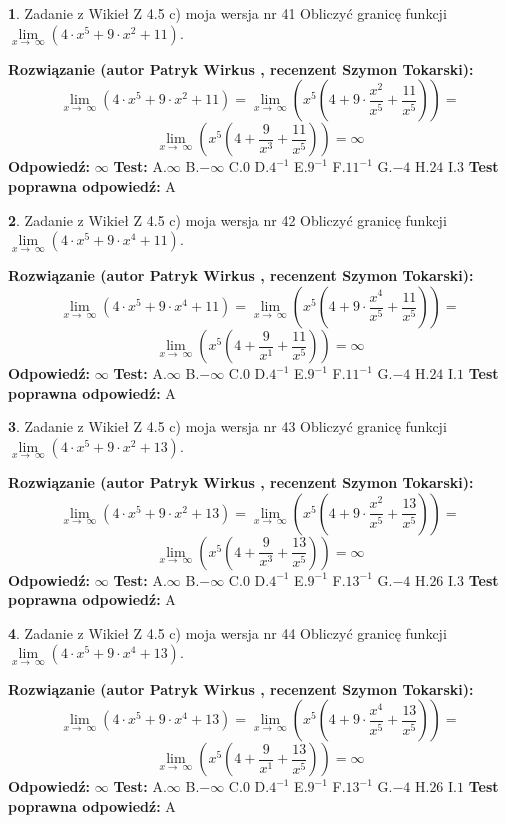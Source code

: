 \documentclass[12pt, a4paper]{article}
\theoremstyle{definition} %
\newtheorem{zad}{}
\newcommand{\zadStart}[1]{\begin{zad}#1\newline}
\newcommand{\zadStop}{\end{zad}}
\newcommand{\rozwStart}[2]{\noindent \textbf{Rozwiązanie (autor #1 , recenzent #2): }\newline}
\newcommand{\rozwStop}{\newline}
\newcommand{\odpStart}{\noindent \textbf{Odpowiedź:}\newline}
\newcommand{\odpStop}{\newline}
\newcommand{\testStart}{\noindent \textbf{Test:}\newline}
\newcommand{\testStop}{\newline}
\newcommand{\kluczStart}{\noindent \textbf{Test poprawna odpowiedź:}\newline}
\newcommand{\kluczStop}{\newline}
\begin{document}
\zadStart{Zadanie z Wikieł Z 4.5 c) moja wersja nr 41}
Obliczyć granicę funkcji  $\lim\limits_{x\to\ \infty}(4 \cdot x^{5}+9 \cdot x^{2}+11)$.
\zadStop
\rozwStart{Patryk Wirkus}{Szymon Tokarski}
$$\lim\limits_{x\to\ \infty}(4 \cdot x^{5}+9 \cdot x^{2}+11) = \lim\limits_{x\to\ \infty}(x^{5}(4 +9 \cdot \frac{x^{2}}{x^{5}}+\frac{11}{x^{5}})) =$$ $$\lim\limits_{x\to\ \infty}(x^{5}(4 +\frac{9}{x^{3}}+\frac{11}{x^{5}})) =\infty$$
\rozwStop
\odpStart
$\infty$
\odpStop
\testStart
A.$\infty$ B.$-\infty$ C.$0$ D.$4^{-1}$ E.$9^{-1}$
F.$11^{-1}$ G.$-4$
H.$24$
I.$3$
\testStop
\kluczStart
A
\kluczStop



\zadStart{Zadanie z Wikieł Z 4.5 c) moja wersja nr 42}
Obliczyć granicę funkcji  $\lim\limits_{x\to\ \infty}(4 \cdot x^{5}+9 \cdot x^{4}+11)$.
\zadStop
\rozwStart{Patryk Wirkus}{Szymon Tokarski}
$$\lim\limits_{x\to\ \infty}(4 \cdot x^{5}+9 \cdot x^{4}+11) = \lim\limits_{x\to\ \infty}(x^{5}(4 +9 \cdot \frac{x^{4}}{x^{5}}+\frac{11}{x^{5}})) =$$ $$\lim\limits_{x\to\ \infty}(x^{5}(4 +\frac{9}{x^{1}}+\frac{11}{x^{5}})) =\infty$$
\rozwStop
\odpStart
$\infty$
\odpStop
\testStart
A.$\infty$ B.$-\infty$ C.$0$ D.$4^{-1}$ E.$9^{-1}$
F.$11^{-1}$ G.$-4$
H.$24$
I.$1$
\testStop
\kluczStart
A
\kluczStop



\zadStart{Zadanie z Wikieł Z 4.5 c) moja wersja nr 43}
Obliczyć granicę funkcji  $\lim\limits_{x\to\ \infty}(4 \cdot x^{5}+9 \cdot x^{2}+13)$.
\zadStop
\rozwStart{Patryk Wirkus}{Szymon Tokarski}
$$\lim\limits_{x\to\ \infty}(4 \cdot x^{5}+9 \cdot x^{2}+13) = \lim\limits_{x\to\ \infty}(x^{5}(4 +9 \cdot \frac{x^{2}}{x^{5}}+\frac{13}{x^{5}})) =$$ $$\lim\limits_{x\to\ \infty}(x^{5}(4 +\frac{9}{x^{3}}+\frac{13}{x^{5}})) =\infty$$
\rozwStop
\odpStart
$\infty$
\odpStop
\testStart
A.$\infty$ B.$-\infty$ C.$0$ D.$4^{-1}$ E.$9^{-1}$
F.$13^{-1}$ G.$-4$
H.$26$
I.$3$
\testStop
\kluczStart
A
\kluczStop



\zadStart{Zadanie z Wikieł Z 4.5 c) moja wersja nr 44}
Obliczyć granicę funkcji  $\lim\limits_{x\to\ \infty}(4 \cdot x^{5}+9 \cdot x^{4}+13)$.
\zadStop
\rozwStart{Patryk Wirkus}{Szymon Tokarski}
$$\lim\limits_{x\to\ \infty}(4 \cdot x^{5}+9 \cdot x^{4}+13) = \lim\limits_{x\to\ \infty}(x^{5}(4 +9 \cdot \frac{x^{4}}{x^{5}}+\frac{13}{x^{5}})) =$$ $$\lim\limits_{x\to\ \infty}(x^{5}(4 +\frac{9}{x^{1}}+\frac{13}{x^{5}})) =\infty$$
\rozwStop
\odpStart
$\infty$
\odpStop
\testStart
A.$\infty$ B.$-\infty$ C.$0$ D.$4^{-1}$ E.$9^{-1}$
F.$13^{-1}$ G.$-4$
H.$26$
I.$1$
\testStop
\kluczStart
A
\kluczStop
\end{document}
